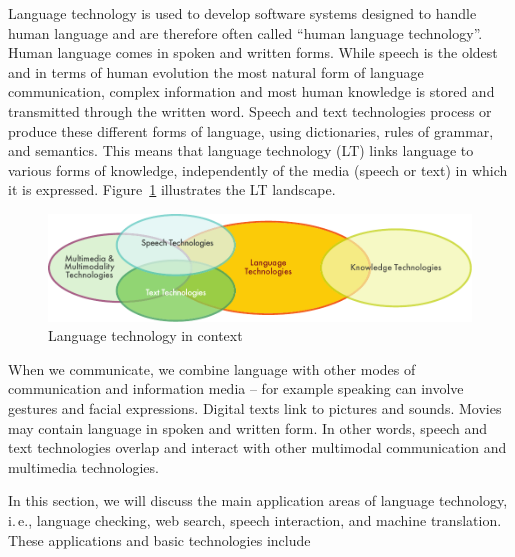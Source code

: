 \documentclass[]{../../metanetpaper}
\begin{document}
\clearpage


\begin{multicols}{2}

Language technology is used to develop software systems designed to handle human language and are therefore often called “human language technology”. Human language comes in spoken and written forms. While speech is the oldest and in terms of human evolution the most natural form of language communication, complex information and most human knowledge is stored and transmitted through the written word. Speech and text technologies process or produce these different forms of language, using dictionaries, rules of grammar, and semantics. This means that language technology (LT) links language to various forms of knowledge, independently of the media (speech or text) in which it is expressed. Figure~\ref{fig:ltincontext_en} illustrates the LT landscape.

\begin{figure}[htb]
  \center
  \includegraphics[width=\textwidth]{../_media/english/language_technologies}
  \caption{Language technology in context}
  \label{fig:ltincontext_en}
\end{figure}

When we communicate, we combine language with other modes of communication and information media – for example speaking can involve gestures and facial expressions. Digital texts link to pictures and sounds. Movies may contain language in spoken and written form. In other words, speech and text technologies overlap and interact with other multimodal communication and multimedia technologies.

In this section, we will discuss the main application areas of language technology, i.\,e., language checking, web search, speech interaction, and machine translation. These applications and basic technologies include 


\end{multicols}
\end{document}
